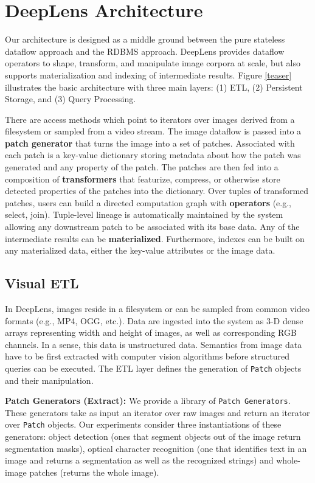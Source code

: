 \section{DeepLens Architecture}
Our architecture is designed as a middle ground between the pure stateless dataflow approach and the RDBMS approach.
\textsf{DeepLens} provides dataflow operators to shape, transform, and manipulate image corpora at scale, but also supports materialization and indexing of intermediate results.
Figure \ref{teaser} illustrates the basic architecture with three main layers: (1) ETL, (2) Persistent Storage, and (3) Query Processing.

There are access methods which point to iterators over images derived from a filesystem or sampled from a video stream. The image dataflow is passed into a  \textbf{patch generator} that turns the image into a set of patches. Associated with each patch is a key-value dictionary storing metadata about how the patch was generated and any property of the patch. The patches are then fed into a composition of \textbf{transformers} that featurize, compress, or otherwise store detected properties of the patches into the dictionary. Over tuples of transformed patches, users can build a directed computation graph with \textbf{operators} (e.g., select, join).
Tuple-level lineage is automatically maintained by the system allowing any downstream patch to be associated with its base data.
Any of the intermediate results can be \textbf{materialized}. 
Furthermore, indexes can be built on any materialized data, either the key-value attributes or the image data.

\subsection{Visual ETL}
\label{subsection:visualETL}
In \textsf{DeepLens},  images reside in a filesystem or can be sampled from common video formats (e.g., MP4, OGG, etc.). Data are ingested into the system as 3-D dense arrays representing width and height of images, as well as  corresponding RGB channels. In a sense, this data is unstructured data. Semantics from image data have to be first extracted with computer vision algorithms before structured queries can be executed. 
The ETL layer defines the generation of \texttt{Patch} objects and their manipulation.

\vspace{0.25em}
\noindent \textbf{Patch Generators (Extract): } We provide a library of \texttt{Patch Generators}. 
These generators take as input an iterator over raw images and return an iterator over \texttt{Patch} objects.  
Our experiments consider three instantiations of these generators: object detection (ones that segment objects out of the image return segmentation masks), optical character recognition (one that identifies text in an image and returns a segmentation as well as the recognized strings) and whole-image patches (returns the whole image).


